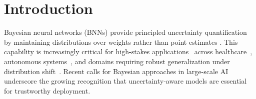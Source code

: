\documentclass{article}
\theoremstyle{plain}
\theoremstyle{definition}
\theoremstyle{remark}
\begin{document}
\section{Introduction}
Bayesian neural networks (BNNs) provide principled uncertainty quantification by maintaining distributions over weights rather than point estimates \cite{mackay1992,neal1996bayesian}. This capability is increasingly critical for high-stakes applications~\cite{amodei2016concrete} across healthcare~\cite{ruhe2019bayesian, dusenberry2020efficient, dusenberry2020analyzing}, 
autonomous systems~\cite{kendall2017uncertainties}, and domains requiring 
robust generalization under distribution shift~\cite{hendrycks2016baseline,louizos2017multiplicative, ovadia2019can,abdar2021review}. Recent calls for Bayesian approaches in large-scale AI \cite{papamarkou2024position} underscore the growing recognition that uncertainty-aware models are essential for trustworthy deployment.
\end{document}
